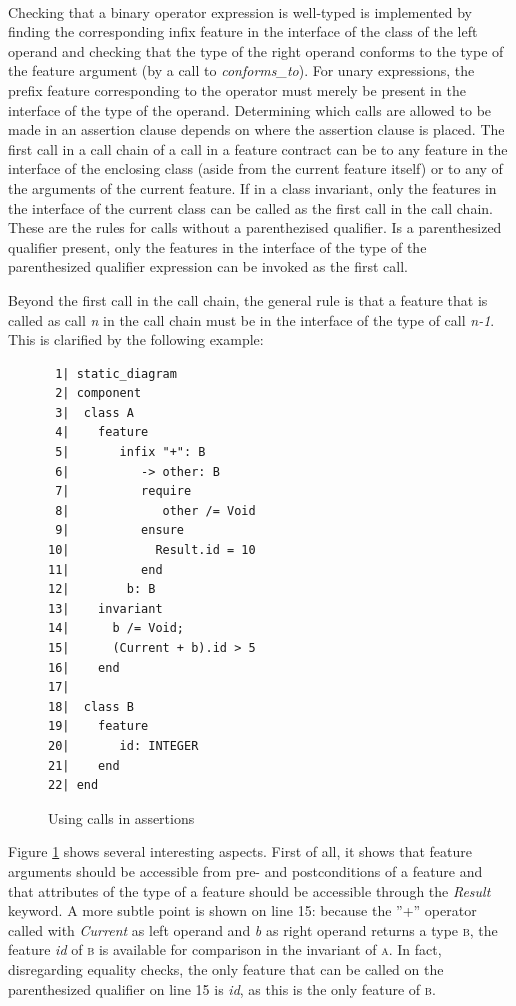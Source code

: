 \paragraph{}
Checking that a binary operator expression is well-typed is implemented by finding the corresponding infix feature in the interface of the class of the left operand and checking that the type of the right operand conforms to the type of the feature argument (by a call to \textit{conforms\_to}). For unary expressions, the prefix feature corresponding to the operator must merely be present in the interface of the type of the operand. 
Determining which calls are allowed to be made in an assertion clause depends on where the assertion clause is placed. The first call in a call chain of a call in a feature contract can be to any feature in the interface of the enclosing class (aside from the current feature itself) or to any of the arguments of the current feature. If in a class invariant, only the features in the interface of the current class can be called as the first call in the call chain. These are the rules for calls without a parenthezised qualifier. Is a parenthesized qualifier present, only the features in the interface of the type of the parenthesized qualifier expression can be invoked as the first call.

Beyond the first call in the call chain, the general rule is that a feature that is called as call \textit{n} in the call chain must be in the interface of the type of call \textit{n-1}. This is clarified by the following example:
\begin{figure}[H]
{\footnotesize
\begin{verbatim}
 1| static_diagram
 2| component
 3|  class A
 4|    feature
 5|       infix "+": B
 6|          -> other: B
 7|          require
 8|             other /= Void
 9|          ensure
10|            Result.id = 10
11|          end
12|        b: B
13|    invariant
14|      b /= Void;
15|      (Current + b).id > 5
16|    end
17|  
18|  class B
19|    feature
20|       id: INTEGER
21|    end
22| end
\end{verbatim}
}
\caption{Using calls in assertions}
\label{fig:call_assertions}
\end{figure}
Figure \ref{fig:call_assertions} shows several interesting aspects. First of all, it shows that feature arguments should be accessible from pre- and postconditions of a feature and that attributes of the type of a feature should be accessible through the \textit{Result} keyword. A more subtle point is shown on line 15: because the ''+'' operator called with \textit{Current} as left operand and \textit{b} as right operand returns a type \textsc{b}, the feature \textit{id} of \textsc{b} is available for comparison in the invariant of \textsc{a}. In fact, disregarding equality checks, the only feature that can be called on the parenthesized qualifier on line 15 is \textit{id}, as this is the only feature of \textsc{b}.
